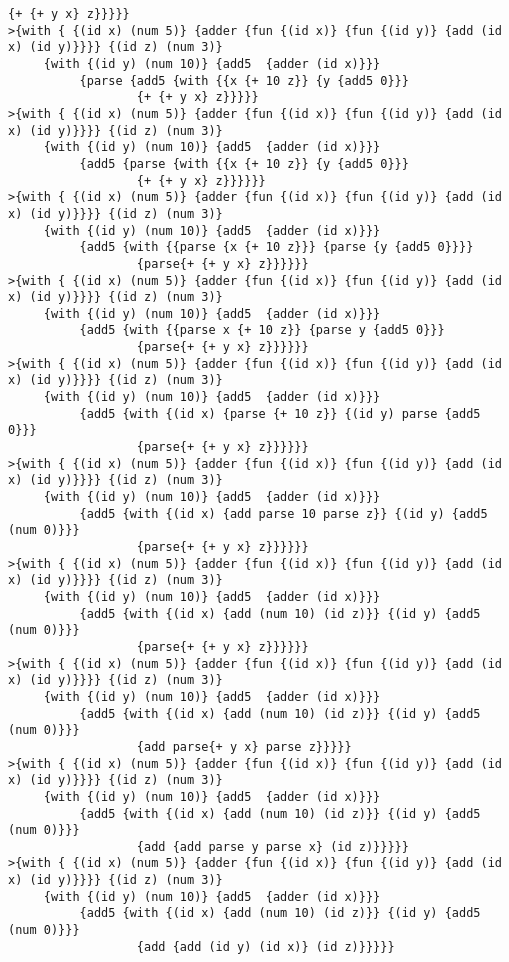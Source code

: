 \documentclass[letterpaper,11pt]{article}
\begin{document}
\begin{lstlisting}[breaklines]
                  {+ {+ y x} z}}}}}
>{with { {(id x) (num 5)} {adder {fun {(id x)} {fun {(id y)} {add (id x) (id y)}}}} {(id z) (num 3)}
     {with {(id y) (num 10)} {add5  {adder (id x)}}}
          {parse {add5 {with {{x {+ 10 z}} {y {add5 0}}}
                  {+ {+ y x} z}}}}}
>{with { {(id x) (num 5)} {adder {fun {(id x)} {fun {(id y)} {add (id x) (id y)}}}} {(id z) (num 3)}
     {with {(id y) (num 10)} {add5  {adder (id x)}}}
          {add5 {parse {with {{x {+ 10 z}} {y {add5 0}}}
                  {+ {+ y x} z}}}}}}
>{with { {(id x) (num 5)} {adder {fun {(id x)} {fun {(id y)} {add (id x) (id y)}}}} {(id z) (num 3)}
     {with {(id y) (num 10)} {add5  {adder (id x)}}}
          {add5 {with {{parse {x {+ 10 z}}} {parse {y {add5 0}}}}
                  {parse{+ {+ y x} z}}}}}}
>{with { {(id x) (num 5)} {adder {fun {(id x)} {fun {(id y)} {add (id x) (id y)}}}} {(id z) (num 3)}
     {with {(id y) (num 10)} {add5  {adder (id x)}}}
          {add5 {with {{parse x {+ 10 z}} {parse y {add5 0}}}
                  {parse{+ {+ y x} z}}}}}}
>{with { {(id x) (num 5)} {adder {fun {(id x)} {fun {(id y)} {add (id x) (id y)}}}} {(id z) (num 3)}
     {with {(id y) (num 10)} {add5  {adder (id x)}}}
          {add5 {with {(id x) {parse {+ 10 z}} {(id y) parse {add5 0}}}
                  {parse{+ {+ y x} z}}}}}}
>{with { {(id x) (num 5)} {adder {fun {(id x)} {fun {(id y)} {add (id x) (id y)}}}} {(id z) (num 3)}
     {with {(id y) (num 10)} {add5  {adder (id x)}}}
          {add5 {with {(id x) {add parse 10 parse z}} {(id y) {add5 (num 0)}}}
                  {parse{+ {+ y x} z}}}}}}
>{with { {(id x) (num 5)} {adder {fun {(id x)} {fun {(id y)} {add (id x) (id y)}}}} {(id z) (num 3)}
     {with {(id y) (num 10)} {add5  {adder (id x)}}}
          {add5 {with {(id x) {add (num 10) (id z)}} {(id y) {add5 (num 0)}}}
                  {parse{+ {+ y x} z}}}}}}
>{with { {(id x) (num 5)} {adder {fun {(id x)} {fun {(id y)} {add (id x) (id y)}}}} {(id z) (num 3)}
     {with {(id y) (num 10)} {add5  {adder (id x)}}}
          {add5 {with {(id x) {add (num 10) (id z)}} {(id y) {add5 (num 0)}}}
                  {add parse{+ y x} parse z}}}}}
>{with { {(id x) (num 5)} {adder {fun {(id x)} {fun {(id y)} {add (id x) (id y)}}}} {(id z) (num 3)}
     {with {(id y) (num 10)} {add5  {adder (id x)}}}
          {add5 {with {(id x) {add (num 10) (id z)}} {(id y) {add5 (num 0)}}}
                  {add {add parse y parse x} (id z)}}}}}
>{with { {(id x) (num 5)} {adder {fun {(id x)} {fun {(id y)} {add (id x) (id y)}}}} {(id z) (num 3)}
     {with {(id y) (num 10)} {add5  {adder (id x)}}}
          {add5 {with {(id x) {add (num 10) (id z)}} {(id y) {add5 (num 0)}}}
                  {add {add (id y) (id x)} (id z)}}}}}











\end{lstlisting}
\end{document}

